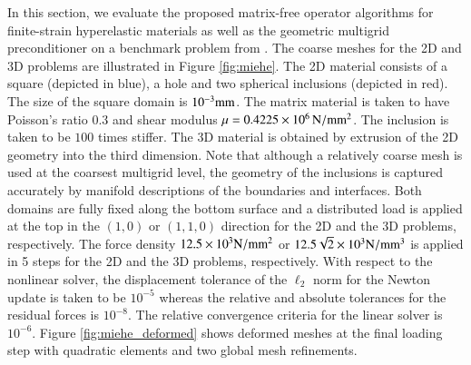 \documentclass[AMA,STIX1COL]{WileyNJD-v2}
\begin{document}
In this section, we evaluate the proposed matrix-free operator algorithms for finite-strain hyperelastic materials as well as the geometric multigrid preconditioner on a benchmark problem from \cite{Miehe2007}. The coarse meshes for the 2D and 3D problems are illustrated in Figure \ref{fig:miehe}. The 2D material consists of a square (depicted in blue), a hole and two spherical inclusions (depicted in red). The size of the square domain is $10^{-3} \rm{mm}$.
The matrix material is taken to have Poisson's ratio $0.3$ and shear modulus $\mu=0.4225 \times 10^6\, \rm{N/mm^2}$. The inclusion is taken to be $100$ times stiffer.
The 3D material is obtained by extrusion of the 2D geometry into the third dimension.
Note that although a relatively coarse mesh is used at the coarsest multigrid level, the geometry of the inclusions is captured accurately by manifold descriptions of the boundaries and interfaces.
Both domains are fully fixed along the bottom surface and a distributed load is applied at the top in the $(1,0)$ or $(1,1,0)$ direction for the 2D and the 3D problems, respectively.
The force density $12.5 \times 10^3 \rm{N/mm^2}$ or $12.5 \sqrt{2} \times 10^3 \rm{N/mm^3}$ is applied in 5 steps for the 2D and the 3D problems, respectively.
With respect to the nonlinear solver, the displacement tolerance of the $\mathcal{\ell}_2$ norm for the Newton update is taken to be $10^{-5}$ whereas the relative and absolute tolerances for the residual forces is $10^{-8}$. The relative convergence criteria for the linear solver is $10^{-6}$.
%
Figure \ref{fig:miehe_deformed} shows deformed meshes at the final loading step with quadratic elements and two global mesh refinements.
%
\end{document}
